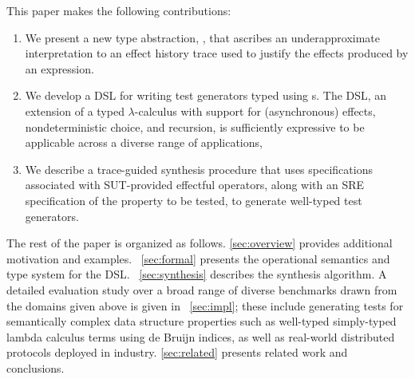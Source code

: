 This paper makes the following contributions:

\begin{enumerate}

\item We present a new type abstraction, \tyName{}, that ascribes an
  underapproximate interpretation to an effect history trace used to
  justify the effects produced by an expression.

\item We develop a DSL for writing test generators typed using
  \tyName{}s.  The DSL, an extension of a typed $\lambda$-calculus
  with support for (asynchronous) effects, nondeterministic choice, and
  recursion, is sufficiently expressive to be applicable across a diverse
  range of applications,

\item We describe a trace-guided synthesis procedure that uses
  \tyName{} specifications associated with SUT-provided effectful
  operators, along with an SRE specification of the property to be
  tested, to generate well-typed test generators.  


\end{enumerate}

The rest of the paper is organized as follows.  \autoref{sec:overview}
provides additional motivation and examples.  ~\autoref{sec:formal}
presents the operational semantics and type system for the \name{} DSL.
~\autoref{sec:synthesis} describes the synthesis algorithm. A detailed
evaluation study over a broad range of diverse benchmarks drawn from
the domains given above is given in ~\autoref{sec:impl}; these include
generating tests for semantically complex data structure properties
such as well-typed simply-typed lambda calculus terms using de Bruijn
indices, as well as real-world distributed protocols deployed in
industry.  \autoref{sec:related} presents related work and conclusions.

